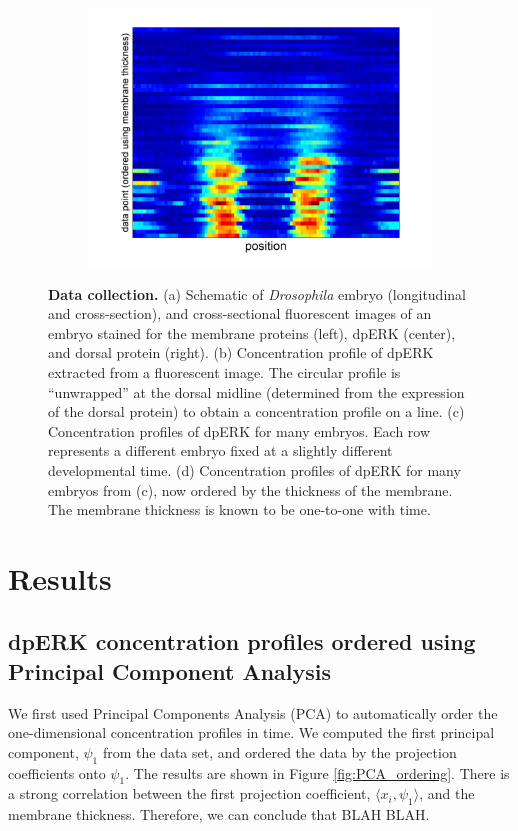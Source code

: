 \documentclass[10pt]{article}
\begin{document}
\begin{figure}[H]
\begin{center}
\begin{subfigure}{0.45\textwidth}
\includegraphics[width=\textwidth]{data_ordered_membrane}
\caption{}
\end{subfigure}
\end{center}
\caption{{\bf Data collection.} (a) Schematic of {\em Drosophila} embryo (longitudinal and cross-section), and cross-sectional fluorescent images of an embryo stained for the membrane proteins (left), dpERK (center), and dorsal protein (right).
(b) Concentration profile of dpERK extracted from a fluorescent image. The circular profile is ``unwrapped'' at the dorsal midline (determined from the expression of the dorsal protein) to obtain a concentration profile on a line.
(c) Concentration profiles of dpERK for many embryos. Each row represents a different embryo fixed at a slightly different developmental time.
(d) Concentration profiles of dpERK for many embryos from (c), now ordered by the thickness of the membrane. The membrane thickness is known to be one-to-one with time.}
\label{fig:background}
\end{figure}

\section*{Results}

\subsection*{dpERK concentration profiles ordered using Principal Component Analysis}

We first used Principal Components Analysis (PCA) to automatically order the one-dimensional concentration profiles in time. 
%
We computed the first principal component, $\psi_1$ from the data set, and ordered the data by the projection coefficients onto $\psi_1$. 
%
The results are shown in Figure \ref{fig:PCA_ordering}.
%
There is a strong correlation between the first projection coefficient, $\langle x_i, \psi_1 \rangle$, and the membrane thickness.
%
Therefore, we can conclude that BLAH BLAH.
\end{document}
